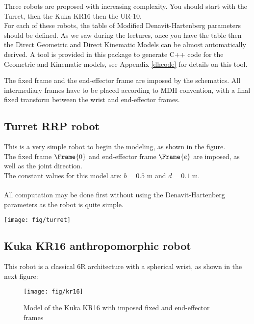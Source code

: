 \documentclass{ecnreport}
\begin{document}
  Three robots are proposed with increasing complexity. You should start with the Turret, then the Kuka KR16 then the UR-10.\\
  For each of these robots, the table of Modified Denavit-Hartenberg parameters should be defined. As we saw during the lectures, once you have the table then the Direct Geometric and Direct Kinematic Models can be almost automatically derived. A tool is provided in this package to generate C++ code for the Geometric and Kinematic models, see Appendix \ref{dhcode} for details on this tool.
  
  The fixed frame and the end-effector frame are imposed by the schematics. 
  All intermediary frames have to be placed according to MDH convention, with a final fixed transform between the wrist and end-effector frames.
  
  \subsection{Turret RRP robot}
  
  \begin{minipage}{.8\linewidth}
    This is a very simple robot to begin the modeling, as shown in the figure.\\
    The fixed frame $\Frame{0}$ and end-effector frame $\Frame{e}$ are imposed, as well as the joint direction.\\
    The constant values for this model are: $b = 0.5$ m and $d = 0.1$ m.\\~\\
    All computation may be done first without using the Denavit-Hartenberg parameters as the robot is quite simple. 
  \end{minipage}
  \begin{minipage}{.2\linewidth}
    \texttt{[image: fig/turret]}\label{turret}
  \end{minipage}
  
  \subsection{Kuka KR16 anthropomorphic robot}
  
  This robot is a classical 6R architecture with a spherical wrist, as shown in the next figure:
  
  \begin{figure}[h!]\centering
    \texttt{[image: fig/kr16]}
    \caption{Model of the Kuka KR16 with imposed fixed and end-effector frames}
  \end{figure}
  
\end{document}
